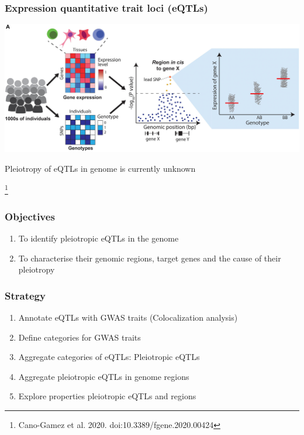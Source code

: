 \documentclass{beamer}
\newcommand\blfootnote[1]{%
    \begingroup
    \renewcommand\thefootnote{}\footnote{#1}%
    \addtocounter{footnote}{-1}%
    \endgroup
}
\begin{document}
    \begin{frame}
        \frametitle{Expression quantitative trait loci (eQTLs)}

        \begin{center}
            \includegraphics[width=\textwidth]{../presentation_230120_gold2022_paris/fig/doi_10.3389_fgene.2020.00424_fig4a.jpg}
        \end{center}
%
        Pleiotropy of eQTLs in genome is currently unknown

        \blfootnote{Cano-Gamez et al. 2020. doi:10.3389/fgene.2020.00424}
    \end{frame}

    \begin{frame}
        \frametitle{Objectives}

        \begin{enumerate}
            \item To identify pleiotropic eQTLs in the genome
            \item To characterise their genomic regions, target genes and the cause of their pleiotropy
        \end{enumerate}
    \end{frame}

    \begin{frame}
        \frametitle{Strategy}

        \begin{enumerate}
            \item Annotate eQTLs with GWAS traits (Colocalization analysis)
            \item Define categories for GWAS traits
            \item Aggregate categories of eQTLs: Pleiotropic eQTLs
            \item Aggregate pleiotropic eQTLs in genome regions
            \item Explore properties pleiotropic eQTLs and regions
        \end{enumerate}
    \end{frame}
\end{document}
